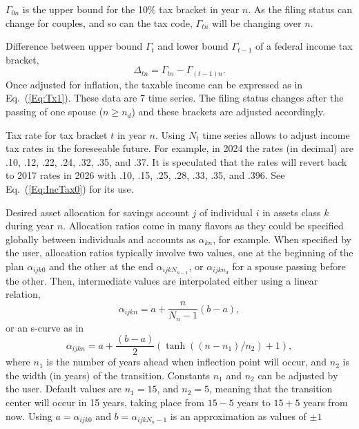 \documentclass{report}[fleqn,11pt]
\begin{document}
\begin{description}[leftmargin=4em,style=multiline]
	$\Gamma_{0n}$ is the upper bound for the 10\% tax bracket in year $n$. As the filing status
	can change for couples, and so can the tax code, $\Gamma_{tn}$ will be changing over $n$.
\item [$\Delta_{tn}$]
	Difference between upper bound $\Gamma_t$ and lower bound $\Gamma_{t-1}$
	of a federal income tax bracket,
	\begin{equation}
		\Delta_{tn} = \Gamma_{tn} - \Gamma_{(t-1)n}.
	\end{equation}
	Once adjusted for inflation,
	the taxable income can be expressed as in Eq.~(\ref{Eq:Tx1}). These data are 7 time series.
	The filing status changes after the passing of one spouse ($n \ge n_d$) and these
	brackets are adjusted accordingly.
\item [$\theta_{tn}$]
	Tax rate for tax bracket $t$ in year $n$. Using $N_t$ time series allows to adjust income
	tax rates in the foreseeable future.
	For example, in 2024 the rates (in decimal) are .10, .12, .22, .24, .32, .35, and .37.
	It is speculated that the rates will revert back to 2017 rates in 2026 with
	.10, .15, .25, .28, .33, .35, and .396. See Eq.~(\ref{Eq:IncTax0}) for its use.
\item [$\alpha_{ijkn}$]
	Desired asset allocation for savings account $j$ of individual $i$ in
	assets class $k$ during year $n$.
	Allocation ratios come in many flavors as they could be specified globally between
	individuals and accounts as $\alpha_{kn}$, for example.
	When specified by the user, allocation ratios typically involve two values, one at the
	beginning of the plan $\alpha_{ijk0}$ and the other at the end
	$\alpha_{ijkN_{n-1}}$, or $\alpha_{ijkn_d}$ for a spouse passing before the other.
        Then, intermediate values are interpolated either using
	a linear relation,
\begin{equation}
	\alpha_{ijkn} = a + \frac{n}{N_n - 1} (b - a),
\end{equation}
or an s-curve as in
\begin{equation}
	\alpha_{ijkn} = a + \frac{(b - a)}{2}
	(\tanh((n-n_1)/n_2) + 1),
\end{equation}
	where $n_1$ is the number of years ahead when inflection point will occur, and $n_2$ is the
	width (in years) of the transition. Constants $n_1$ and $n_2$ can be adjusted by the user.
	Default values are $n_1 = 15$, and $n_2 = 5$, meaning that the transition center will occur
	in 15 years, taking place from $15-5$ years to $15+5$ years from now.
	Using $a = \alpha_{ijk0}$ and $b = \alpha_{ijkN_n-1}$ is an approximation as values of $\pm 1$

\end{description}
\end{document}
